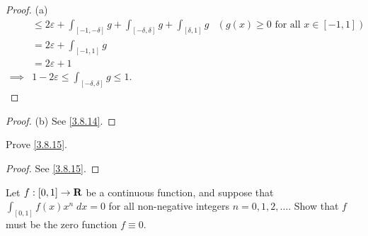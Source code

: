 \begin{proof}{(a)}
\begin{align*}
             & \leq 2 \varepsilon + \int_{[-1, -\delta]} g + \int_{[-\delta, \delta]} g + \int_{[\delta, 1]} g & (g(x) \geq 0 \text{ for all } x \in [-1, 1]) \\
             & = 2 \varepsilon + \int_{[-1, 1]} g                                                                                                             \\
             & = 2 \varepsilon + 1                                                                                                                            \\
    \implies & 1 - 2 \varepsilon \leq \int_{[-\delta, \delta]} g \leq 1.
  \end{align*}
\end{proof}

\begin{proof}{(b)}
  See \cref{3.8.14}.
\end{proof}

\begin{exercise}\label{ex 3.8.7}
  Prove \cref{3.8.15}.
\end{exercise}

\begin{proof}
  See \cref{3.8.15}.
\end{proof}

\begin{exercise}\label{ex 3.8.8}
  Let \(f : [0, 1] \to \mathbf{R}\) be a continuous function, and suppose that \(\int_{[0, 1]} f(x) x^n \; dx = 0\) for all non-negative integers \(n = 0, 1, 2, \dots\).
  Show that \(f\) must be the zero function \(f \equiv 0\).
\end{exercise}

